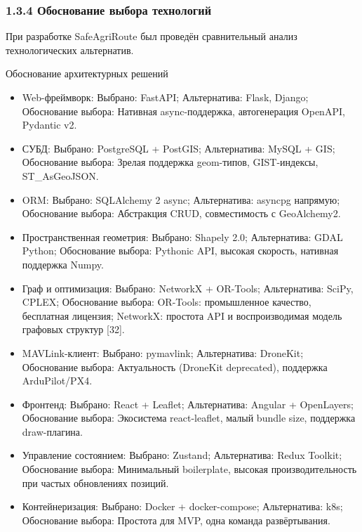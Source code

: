 \documentclass[14pt,a4paper]{extarticle}
\begin{document}
\hypertarget{ux43eux431ux43eux441ux43dux43eux432ux430ux43dux438ux435-ux432ux44bux431ux43eux440ux430-ux442ux435ux445ux43dux43eux43bux43eux433ux438ux439}{%
\subsubsection{1.3.4 Обоснование выбора технологий}\label{ux43eux431ux43eux441ux43dux43eux432ux430ux43dux438ux435-ux432ux44bux431ux43eux440ux430-ux442ux435ux445ux43dux43eux43bux43eux433ux438ux439}}

При разработке SafeAgriRoute был проведён сравнительный анализ технологических альтернатив.

Обоснование архитектурных решений
\begin{itemize}
\item Web-фреймворк: Выбрано: FastAPI; Альтернатива: Flask, Django; Обоснование выбора: Нативная async-поддержка, автогенерация OpenAPI, Pydantic v2.
\item СУБД: Выбрано: PostgreSQL + PostGIS; Альтернатива: MySQL + GIS; Обоснование выбора: Зрелая поддержка geom-типов, GIST-индексы, ST\_AsGeoJSON.
\item ORM: Выбрано: SQLAlchemy 2 async; Альтернатива: asyncpg напрямую; Обоснование выбора: Абстракция CRUD, совместимость с GeoAlchemy2.
\item Пространственная геометрия: Выбрано: Shapely 2.0; Альтернатива: GDAL Python; Обоснование выбора: Pythonic API, высокая скорость, нативная поддержка Numpy.
\item Граф и оптимизация: Выбрано: NetworkX + OR-Tools; Альтернатива: SciPy, CPLEX; Обоснование выбора: OR-Tools: промышленное качество, бесплатная лицензия; NetworkX: простота API и воспроизводимая модель графовых структур [32].
\item MAVLink-клиент: Выбрано: pymavlink; Альтернатива: DroneKit; Обоснование выбора: Актуальность (DroneKit deprecated), поддержка ArduPilot/PX4.
\item Фронтенд: Выбрано: React + Leaflet; Альтернатива: Angular + OpenLayers; Обоснование выбора: Экосистема react-leaflet, малый bundle size, поддержка draw-плагина.
\item Управление состоянием: Выбрано: Zustand; Альтернатива: Redux Toolkit; Обоснование выбора: Минимальный boilerplate, высокая производительность при частых обновлениях позиций.
\item Контейнеризация: Выбрано: Docker + docker-compose; Альтернатива: k8s; Обоснование выбора: Простота для MVP, одна команда развёртывания.
\end{itemize}
\end{document}
